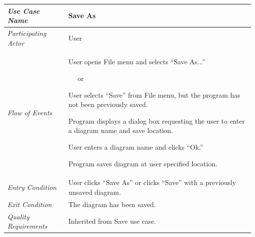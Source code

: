\documentclass[twoside,letterpaper]{article}
\newenvironment{my_enumerate}{
\begin{enumerate}
  \setlength{\itemsep}{1pt}
  \setlength{\parskip}{0pt}
  \setlength{\parsep}{0pt}}{\end{enumerate}
}
\begin{document}
\begin{flushleft}
\tablehead{}
\begin{tabular}{|m{2.0in} m{5.0in}|}
\hline
{\bfseries\emph{Use Case Name}}
& {\bfseries Save As}
\\\hline
\emph{Participating Actor}
& User
\\\hline
\emph{Flow of Events}
& \begin{my_enumerate}
\item User opens File menu and selects ``Save As...''
\end{my_enumerate}
\ ~ or
\begin{my_enumerate}
\item User selects ``Save'' from File menu, but the program has not been previously saved.
\item Program displays a dialog box requesting the user to enter a diagram name and save location.
\item User enters a diagram name and clicks ``Ok.''
\item Program saves diagram at user specified location.
\end{my_enumerate}
\\\hline
\emph{Entry Condition}
& User clicks ``Save As'' or clicks ``Save'' with a previously unsaved diagram. 
\\\hline
\emph{Exit Condition}
& The diagram has been saved.
\\\hline
\emph{Quality Requirements}
& Inherited from Save use case. 
\\\hline
\end{tabular}
\end{flushleft}
\bigskip
\end{document}
